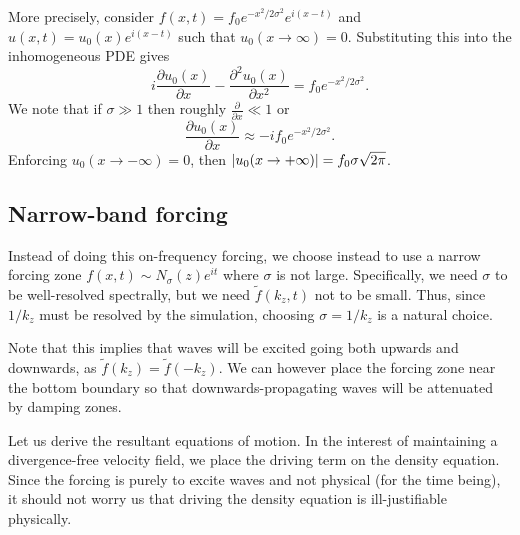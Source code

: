 \documentclass[11pt,
        usenames, %
        dvipsnames %
    ]{report}
\newcommand*{\pd}[2]{\frac{\partial#1}{\partial#2}}
\newcommand*{\ptd}[2]{\frac{\partial^2 #1}{\partial#2^2}}
\DeclarePairedDelimiter\abs{\lvert}{\rvert}
\begin{document}
More precisely, consider $f(x, t) = f_0e^{-x^2/2\sigma^2} e^{i(x - t)}$ and $u(x,
t) = u_0(x)e^{i(x - t)}$ such that $u_0(x \to \infty) = 0$. Substituting this
into the inhomogeneous PDE gives
\begin{equation}
    i\pd{u_0(x)}{x} - \ptd{u_0(x)}{x} = f_0e^{-x^2/2\sigma^2}.
\end{equation}
We note that if $\sigma \gg 1$ then roughly $\pd{}{x} \ll 1$ or
\begin{equation}
    \pd{u_0(x)}{x} \approx -if_0e^{-x^2/2\sigma^2}.
\end{equation}
Enforcing $u_0(x \to -\infty) = 0$, then $\abs*{u_0(x \to +\infty)} =
f_0\sigma\sqrt{2\pi}$.

\subsection{Narrow-band forcing}

Instead of doing this on-frequency forcing, we choose instead to use a narrow
forcing zone $f(x, t) \sim N_{\sigma}(z)e^{it}$ where $\sigma$ is not large.
Specifically, we need $\sigma$ to be well-resolved spectrally, but we need
$\tilde{f}(k_z, t)$ not to be small. Thus, since $1/k_z$ must be resolved by the
simulation, choosing $\sigma = 1/k_z$ is a natural choice.

Note that this implies that waves will be excited going both upwards and
downwards, as $\tilde{f}(k_z) = \tilde{f}(-k_z)$. We can however place the
forcing zone near the bottom boundary so that downwards-propagating waves will
be attenuated by damping zones.

Let us derive the resultant equations of motion. In the interest of maintaining
a divergence-free velocity field, we place the driving term on the density
equation. Since the forcing is purely to excite waves and not physical (for the
time being), it should not worry us that driving the density equation is
ill-justifiable physically.
\end{document}
